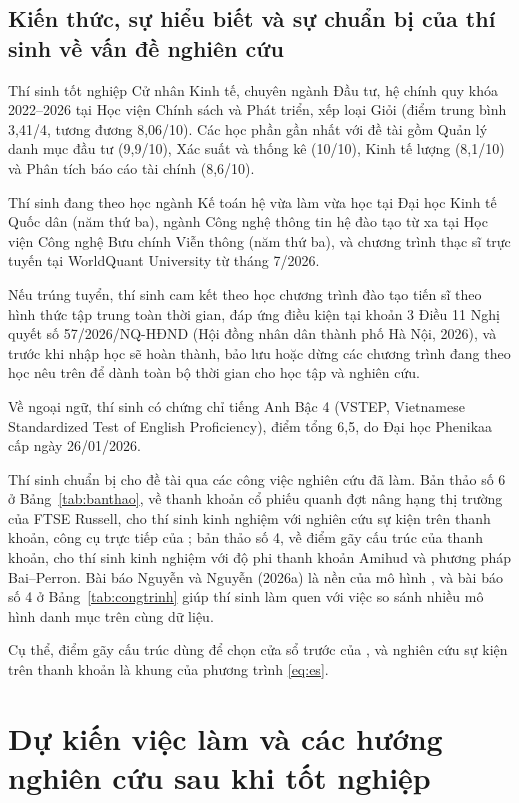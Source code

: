 \section{Kiến thức, sự hiểu biết và sự chuẩn bị của thí sinh về vấn đề nghiên cứu}

Thí sinh tốt nghiệp Cử nhân Kinh tế, chuyên ngành Đầu tư, hệ chính quy khóa 2022--2026 tại Học viện Chính sách và Phát triển, xếp loại Giỏi (điểm trung bình 3,41/4, tương đương 8,06/10). Các học phần gần nhất với đề tài gồm Quản lý danh mục đầu tư (9,9/10), Xác suất và thống kê (10/10), Kinh tế lượng (8,1/10) và Phân tích báo cáo tài chính (8,6/10).

Thí sinh đang theo học ngành Kế toán hệ vừa làm vừa học tại Đại học Kinh tế Quốc dân (năm thứ ba), ngành Công nghệ thông tin hệ đào tạo từ xa tại Học viện Công nghệ Bưu chính Viễn thông (năm thứ ba), và chương trình thạc sĩ trực tuyến tại WorldQuant University từ tháng 7/2026.

Nếu trúng tuyển, thí sinh cam kết theo học chương trình đào tạo tiến sĩ theo hình thức tập trung toàn thời gian, đáp ứng điều kiện tại khoản 3 Điều 11 Nghị quyết số 57/2026/NQ-HĐND (Hội đồng nhân dân thành phố Hà Nội, 2026), và trước khi nhập học sẽ hoàn thành, bảo lưu hoặc dừng các chương trình đang theo học nêu trên để dành toàn bộ thời gian cho học tập và nghiên cứu.

Về ngoại ngữ, thí sinh có chứng chỉ tiếng Anh Bậc 4 (VSTEP, Vietnamese Standardized Test of English Proficiency), điểm tổng 6,5, do Đại học Phenikaa cấp ngày 26/01/2026.

Thí sinh chuẩn bị cho đề tài qua các công việc nghiên cứu đã làm. Bản thảo số 6 ở Bảng~\ref{tab:banthao}, về thanh khoản cổ phiếu quanh đợt nâng hạng thị trường của FTSE Russell, cho thí sinh kinh nghiệm với nghiên cứu sự kiện trên thanh khoản, công cụ trực tiếp của ; bản thảo số 4, về điểm gãy cấu trúc của thanh khoản, cho thí sinh kinh nghiệm với độ phi thanh khoản Amihud và phương pháp Bai--Perron. Bài báo Nguyễn và Nguyễn (2026a) là nền của mô hình , và bài báo số 4 ở Bảng~\ref{tab:congtrinh} giúp thí sinh làm quen với việc so sánh nhiều mô hình danh mục trên cùng dữ liệu.

Cụ thể, điểm gãy cấu trúc dùng để chọn cửa sổ trước của , và nghiên cứu sự kiện trên thanh khoản là khung của phương trình \eqref{eq:es}.

\chapter{Dự kiến việc làm và các hướng nghiên cứu sau khi tốt nghiệp}\label{ch:9}

